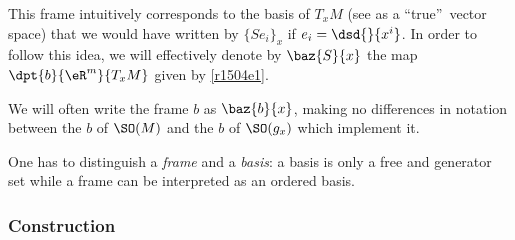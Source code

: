 This frame intuitively corresponds to the basis of $T_xM$ (see as a ``true''\ vector space) that we would have written by $\{Se_i\}_x$ if $e_i=\dsd{}{x^i}$. In order to follow this idea, we will effectively denote by $\baz{S}{x}$ the map $\dpt{b}{\eR^m}{T_xM}$ given by \eqref{r1504e1}.

We will often write the frame $b$ as $\baz{b}{x}$, making no differences in notation between the $b$ of $\SO(M)$ and the $b$ of $\SO(g_x)$ which implement it.

\begin{remark}
One has to distinguish a \emph{frame} and a \emph{basis}: a basis is only a free and generator set while a frame can be interpreted as an ordered basis.
\end{remark}


\subsubsection{Construction}


